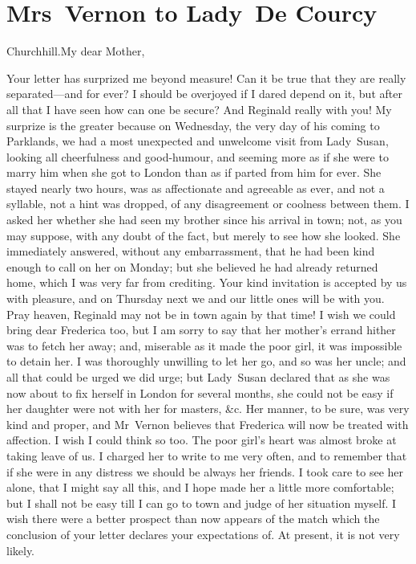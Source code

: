 \chapter{Mrs~Vernon to Lady~De Courcy}
  
  \begin{mail}{Churchhill.}{My dear Mother,}
  
Your letter has surprized me beyond measure! Can it be true that they are really separated—and for ever? I should be overjoyed if I dared depend on it, but after all that I have seen how can one be secure? And Reginald really with you! My surprize is the greater because on Wednesday, the very day of his coming to Parklands, we had a most unexpected and unwelcome visit from Lady~Susan, looking all cheerfulness and good-humour, and seeming more as if she were to marry him when she got to London than as if parted from him for ever. She stayed nearly two hours, was as affectionate and agreeable as ever, and not a syllable, not a hint was dropped, of any disagreement or coolness between them. I asked her whether she had seen my brother since his arrival in town; not, as you may suppose, with any doubt of the fact, but merely to see how she looked. She immediately answered, without any embarrassment, that he had been kind enough to call on her on Monday; but she believed he had already returned home, which I was very far from crediting. Your kind invitation is accepted by us with pleasure, and on Thursday next we and our little ones will be with you. Pray heaven, Reginald may not be in town again by that time! I wish we could bring dear Frederica too, but I am sorry to say that her mother's errand hither was to fetch her away; and, miserable as it made the poor girl, it was impossible to detain her. I was thoroughly unwilling to let her go, and so was her uncle; and all that could be urged we did urge; but Lady~Susan declared that as she was now about to fix herself in London for several months, she could not be easy if her daughter were not with her for masters, \&c. Her manner, to be sure, was very kind and proper, and Mr~Vernon believes that Frederica will now be treated with affection. I wish I could think so too. The poor girl's heart was almost broke at taking leave of us. I charged her to write to me very often, and to remember that if she were in any distress we should be always her friends. I took care to see her alone, that I might say all this, and I hope made her a little more comfortable; but I shall not be easy till I can go to town and judge of her situation myself. I wish there were a better prospect than now appears of the match which the conclusion of your letter declares your expectations of. At present, it is not very likely. 

\end{mail}